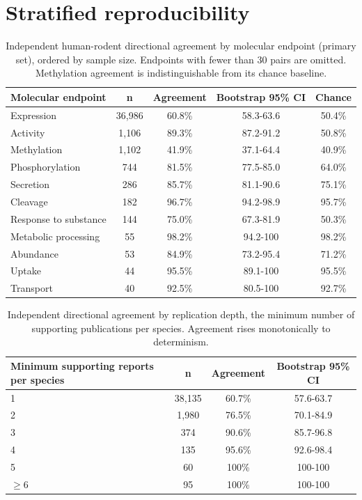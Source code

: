 \documentclass[11pt]{elsarticle}
\begin{document}
\clearpage
\section{Stratified reproducibility}

\begin{table}[H]
\small
\centering
\caption{Independent human-rodent directional agreement by molecular endpoint
(primary set), ordered by sample size. Endpoints with fewer than 30 pairs are
omitted. Methylation agreement is indistinguishable from its chance baseline.}
\label{tab:s1}
\begin{tabular}{lcccc}
\toprule
Molecular endpoint & n & Agreement & Bootstrap 95\% CI & Chance \\
\midrule
Expression & 36{,}986 & 60.8\% & 58.3-63.6 & 50.4\% \\
Activity & 1{,}106 & 89.3\% & 87.2-91.2 & 50.8\% \\
Methylation & 1{,}102 & 41.9\% & 37.1-64.4 & 40.9\% \\
Phosphorylation & 744 & 81.5\% & 77.5-85.0 & 64.0\% \\
Secretion & 286 & 85.7\% & 81.1-90.6 & 75.1\% \\
Cleavage & 182 & 96.7\% & 94.2-98.9 & 95.7\% \\
Response to substance & 144 & 75.0\% & 67.3-81.9 & 50.3\% \\
Metabolic processing & 55 & 98.2\% & 94.2-100 & 98.2\% \\
Abundance & 53 & 84.9\% & 73.2-95.4 & 71.2\% \\
Uptake & 44 & 95.5\% & 89.1-100 & 95.5\% \\
Transport & 40 & 92.5\% & 80.5-100 & 92.7\% \\
\bottomrule
\end{tabular}
\end{table}

\begin{table}[H]
\small
\centering
\caption{Independent directional agreement by replication depth, the minimum
number of supporting publications per species. Agreement rises monotonically to
determinism.}
\label{tab:s2}
\begin{tabular}{lccc}
\toprule
Minimum supporting reports per species & n & Agreement & Bootstrap 95\% CI \\
\midrule
1 & 38{,}135 & 60.7\% & 57.6-63.7 \\
2 & 1{,}980 & 76.5\% & 70.1-84.9 \\
3 & 374 & 90.6\% & 85.7-96.8 \\
4 & 135 & 95.6\% & 92.6-98.4 \\
5 & 60 & 100\% & 100-100 \\
$\geq$6 & 95 & 100\% & 100-100 \\
\bottomrule
\end{tabular}
\end{table}
\end{document}

